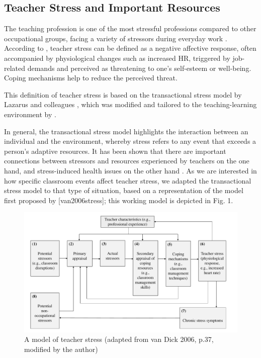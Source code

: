 \documentclass[]{elsarticle} %
\begin{document}
\hypertarget{teacher-stress-and-important-resources}{%
\subsection{Teacher Stress and Important
Resources}\label{teacher-stress-and-important-resources}}

The teaching profession is one of the most stressful professions
compared to other occupational groups, facing a variety of stressors
during everyday work \citep{smith2000, herman2020, schult2014belastet}.
According to \citet{kyriacou1978}, teacher stress can be defined as a
negative affective response, often accompanied by physiological changes
such as increased HR, triggered by job-related demands and perceived as
threatening to one's self-esteem or well-being. Coping mechanisms help
to reduce the perceived threat.

This definition of teacher stress is based on the transactional stress
model by Lazarus and colleagues
\citep{lazarus1981stressbezogene, lazarus1984stress}, which was modified
and tailored to the teaching-learning environment by
\citet{kyriacou1978}.

In general, the transactional stress model \citep{lazarus1990theory}
highlights the interaction between an individual and the environment,
whereby stress refers to any event that exceeds a person's adaptive
resources. It has been shown that there are important connections
between stressors and resources experienced by teachers on the one hand,
and stress-induced health issues on the other hand
\citep{krause2013messung}. As we are interested in how specific
classroom events affect teacher stress, we adapted the transactional
stress model to that type of situation, based on a representation of the
model first proposed by {[}van2006stress{]}; this working model is
depicted in Fig. 1.

\begin{figure}[htbp]
  \centering
  \includegraphics[width=1\textwidth]{images/Model_Teacher_Stress_adapted_new.pdf}
  \caption{A model of teacher stress (adapted from van Dick 2006, p.37, modified by the author)}
  \label{A model of teacher stress (adapted from van Dick 2006, p.37, modified by the author)}
\end{figure}
\end{document}
